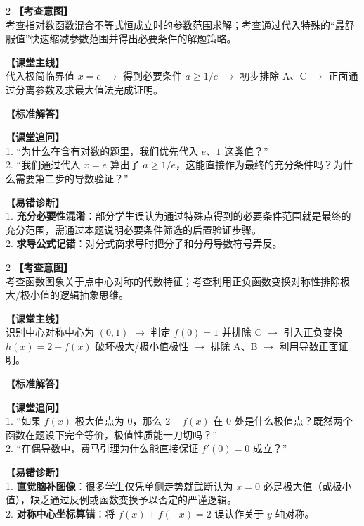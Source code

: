 \documentclass[11pt,a4paper]{ctexart}
\begin{document}
\begin{paracol}{2}
  \textbf{【考查意图】}\\
  考查指对数函数混合不等式恒成立时的参数范围求解；考查通过代入特殊的“最舒服值”快速缩减参数范围并得出必要条件的解题策略。
  
  \textbf{【课堂主线】}\\
  代入极简临界值 \(x=e\) \(\to\) 得到必要条件 \(a \geqslant 1/e\) \(\to\) 初步排除 A、C \(\to\) 正面通过分离参数及求最大值法完成证明。
  
  \textbf{【标准解答】}\\
  \qThreeSolution
  
  \textbf{【课堂追问】}\\
  1. “为什么在含有对数的题里，我们优先代入 \(e\)、\(1\) 这类值？”\\
  2. “我们通过代入 \(x=e\) 算出了 \(a \geqslant 1/e\)，这能直接作为最终的充分条件吗？为什么需要第二步的导数验证？”
  
  \switchcolumn
  \textbf{【易错诊断】}\\
  1. \textbf{充分必要性混淆}：部分学生误认为通过特殊点得到的必要条件范围就是最终的充分范围，需通过本题说明必要条件筛选的后置验证步骤。\\
  2. \textbf{求导公式记错}：对分式商求导时把分子和分母导数符号弄反。
\end{paracol}

\vspace{0.8em}
\par{}
\vspace{0.8em}

\qFourStem
\qFourOptions

\begin{paracol}{2}
  \textbf{【考查意图】}\\
  考查函数图象关于点中心对称的代数特征；考查利用正负函数变换对称性排除极大/极小值的逻辑抽象思维。
  
  \textbf{【课堂主线】}\\
  识别中心对称中心为 \((0,1)\) \(\to\) 判定 \(f(0)=1\) 并排除 C \(\to\) 引入正负变换 \(h(x)=2-f(x)\) 破坏极大/极小值极性 \(\to\) 排除 A、B \(\to\) 利用导数正面证明。
  
  \textbf{【标准解答】}\\
  \qFourSolution
  
  \textbf{【课堂追问】}\\
  1. “如果 \(f(x)\) 极大值点为 0，那么 \(2-f(x)\) 在 0 处是什么极值点？既然两个函数在题设下完全等价，极值性质能一刀切吗？”\\
  2. “在偶导数中，费马引理为什么能直接保证 \(f'(0)=0\) 成立？”
  
  \switchcolumn
  \textbf{【易错诊断】}\\
  1. \textbf{直觉脑补图像}：很多学生仅凭单侧走势就武断认为 \(x=0\) 必是极大值（或极小值），缺乏通过反例或函数变换予以否定的严谨逻辑。\\
  2. \textbf{对称中心坐标算错}：将 \(f(x)+f(-x)=2\) 误认作关于 \(y\) 轴对称。
\end{paracol}
\end{document}
